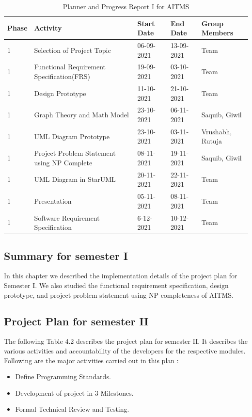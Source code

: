 \documentclass[openany,12pt]{report}
\begin{document}
	\newpage
	\begin{table} [htb]
		\centering
		\begin{tabular}{| p{1.2 cm}| p{5 cm}| p{2.5 cm}| p{2.5 cm}| p{3 cm}| }\hline
			\textbf{Phase}	&\textbf{Activity}	&\textbf{Start Date}	&\textbf{End Date} &\textbf{Group Members}\\\hline\hline
			1 &Selection of Project Topic	&06-09-2021 	&13-09-2021 &Team \\\hline
			1 &Functional Requirement Specification(FRS) &19-09-2021 &03-10-2021 &Team\\\hline
			1 &Design Prototype &11-10-2021 &21-10-2021 &Team\\\hline
			1 &Graph Theory and Math Model &23-10-2021 &06-11-2021 & Saquib, Giwil\\\hline
			1 &UML Diagram Prototype &23-10-2021 &03-11-2021 &Vrushabh, \newline Rutuja \\\hline
			1 &Project Problem Statement using NP Complete &08-11-2021 &19-11-2021 &Saquib, Giwil\\\hline
			1 &UML Diagram in StarUML &20-11-2021 &22-11-2021 &Team \\\hline
			1 &Presentation &05-11-2021 &08-11-2021 &Team \\\hline
			1 &Software Requirement Specification &6-12-2021 &10-12-2021 &Team \\\hline
		\end{tabular}
		\caption{Planner and Progress Report I for AITMS}
		\label{tab:nnwork}
	\end{table}

	\subsection{Summary for semester I}
	\hspace*{0.5 in}In this chapter we described the implementation details of the project plan for
Semester I. We also studied the functional requirement specification, design prototype, and project problem statement using NP completeness of AITMS.

	\newpage
	\subsection{Project Plan for semester II}
	
		\hspace*{0.5 in}The following Table 4.2 describes the project plan for semester II. It describes the various activities and accountability of the developers for the respective modules. Following are the major activities carried out in this plan :
		\begin{itemize}
			\item{Define Programming Standards.}
			\item{Development of project in 3 Milestones.}
			\item{Formal Technical Review and Testing.}
		\end{itemize}
	
\end{document}
